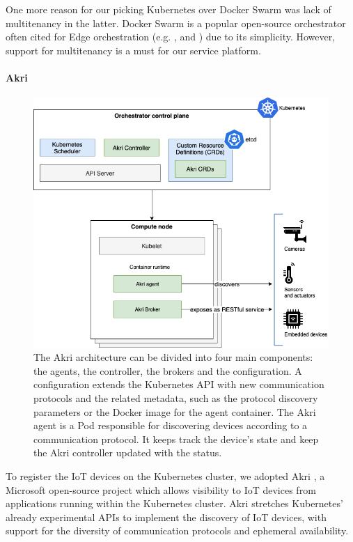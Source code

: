 One more reason for our picking Kubernetes over Docker Swarm \cite{docker-swarm} was lack of multitenancy in the latter. 
Docker Swarm is a popular open-source orchestrator often cited for Edge orchestration (e.g. \cite{bellavista2017feasibility}, and \cite{ismail2015evaluation}) due to its simplicity. However, support for multitenancy is a must for our service platform.

\paragraph{Akri}\label{p:akri}

\begin{figure}[ht]
\centering
\includegraphics[width=\columnwidth]{figures/akri}
\caption{The Akri architecture can be divided into four main components: the agents, the controller, the brokers and the configuration. A configuration extends the Kubernetes API with new communication protocols and the related metadata, such as the protocol discovery parameters or the Docker image for the agent container. The Akri agent is a Pod responsible for discovering devices according to a communication protocol. It keeps track the device's state and keep the Akri controller updated with the status.}
\label{fig:akri}
\end{figure}

To register the IoT devices on the Kubernetes cluster, we adopted Akri \cite{akri}, a Microsoft open-source project which allows visibility to IoT devices from applications running within the Kubernetes cluster. Akri stretches Kubernetes' already experimental APIs to implement the discovery of IoT devices, with support for the diversity of communication protocols and ephemeral availability.

